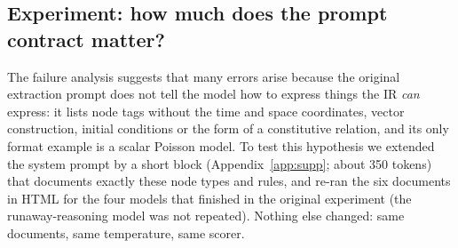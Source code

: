 \subsection{Experiment: how much does the prompt contract matter?}
\label{sec:prompt}
The failure analysis suggests that many errors arise because the original extraction prompt does not tell the model how to express things the IR \emph{can} express: it lists node tags without the time and space coordinates, vector construction, initial conditions or the form of a constitutive relation, and its only format example is a scalar Poisson model. To test this hypothesis we extended the system prompt by a short block (Appendix~\ref{app:supp}; about 350 tokens) that documents exactly these node types and rules, and re-ran the six documents in HTML for the four models that finished in the original experiment (the runaway-reasoning model was not repeated). Nothing else changed: same documents, same temperature, same scorer.

\begin{table}[t]
\centering\small
\caption{Effect of the extended prompt contract (HTML documents, six per model): documents valid, correct and ran (solver compiled and ran) with the original and with the extended prompt.}
\label{tab:v2}

\end{table}

\begin{table}[t]
\centering\small
\caption{Per-document outcome with the extended prompt (\cmark\ correct, $\sim$ valid but not equivalent, \xmark\ rejected at the trust boundary).}
\label{tab:v2matrix}

\end{table}


